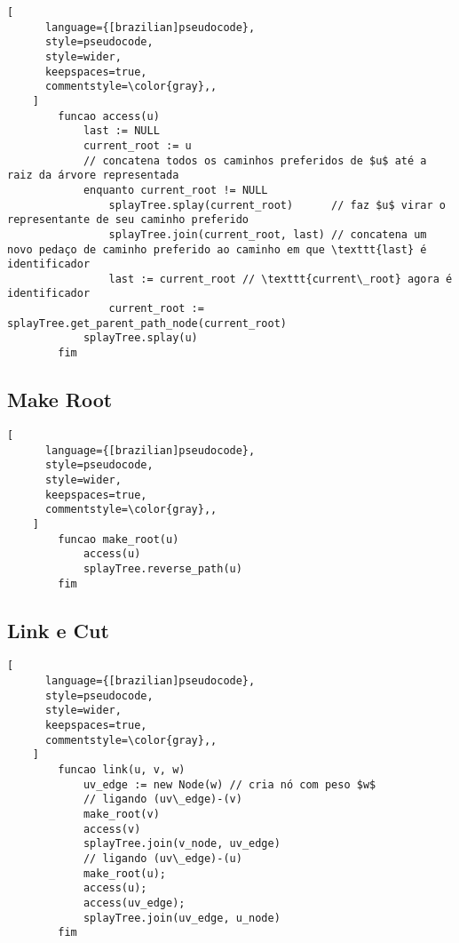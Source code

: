 \begin{programruledcaption}{\label{lct:access}}
    \begin{lstlisting}[
      language={[brazilian]pseudocode},
      style=pseudocode,
      style=wider,
      keepspaces=true,
      commentstyle=\color{gray},,
    ]
        funcao access(u)
            last := NULL
            current_root := u
            // concatena todos os caminhos preferidos de $u$ até a raiz da árvore representada
            enquanto current_root != NULL
                splayTree.splay(current_root)      // faz $u$ virar o representante de seu caminho preferido 
                splayTree.join(current_root, last) // concatena um novo pedaço de caminho preferido ao caminho em que \texttt{last} é identificador
                last := current_root // \texttt{current\_root} agora é identificador
                current_root := splayTree.get_parent_path_node(current_root)
            splayTree.splay(u)
        fim
    \end{lstlisting}
\end{programruledcaption}


\subsection{Make Root}
\label{subsection:lct-make-root}

\begin{programruledcaption}{\label{lct:make-root}}
    \begin{lstlisting}[
      language={[brazilian]pseudocode},
      style=pseudocode,
      style=wider,
      keepspaces=true,
      commentstyle=\color{gray},,
    ]
        funcao make_root(u)
            access(u)
            splayTree.reverse_path(u)
        fim
    \end{lstlisting}
\end{programruledcaption}

\subsection{Link e Cut}
\label{subsection:lct-link-cut}

\begin{programruledcaption}{\label{lct:link}}
    \begin{lstlisting}[
      language={[brazilian]pseudocode},
      style=pseudocode,
      style=wider,
      keepspaces=true,
      commentstyle=\color{gray},,
    ]
        funcao link(u, v, w)
            uv_edge := new Node(w) // cria nó com peso $w$
            // ligando (uv\_edge)-(v)
            make_root(v)
            access(v)
            splayTree.join(v_node, uv_edge)
            // ligando (uv\_edge)-(u)
            make_root(u);
            access(u);
            access(uv_edge);
            splayTree.join(uv_edge, u_node)
        fim
    \end{lstlisting}
\end{programruledcaption}



